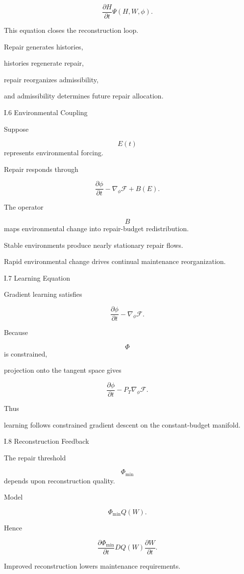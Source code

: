 \documentclass[12pt,oneside]{article}
\theoremstyle{plain}
\theoremstyle{definition}
\theoremstyle{remark}
\begin{document}
\[
\frac{\partial H}{\partial t}
\Psi(H,W,\phi).
\]

This equation closes the reconstruction loop.

Repair generates histories,

histories regenerate repair,

repair reorganizes admissibility,

and admissibility determines future repair allocation.


I.6 Environmental Coupling

Suppose

\[
E(t)
\]
represents environmental forcing.

Repair responds through

\[
\frac{\partial\phi}{\partial t}
- 

\nabla_\phi
\mathcal F
+
B(E).
\]

The operator

\[
B
\]
maps environmental change into repair-budget redistribution.

Stable environments produce nearly stationary repair flows.

Rapid environmental change drives continual maintenance reorganization.


I.7 Learning Equation

Gradient learning satisfies

\[
\frac{\partial\phi}{\partial t}
- 

\nabla_\phi
\mathcal F.
\]

Because

\[
\Phi
\]
is constrained,

projection onto the tangent space gives

\[
\frac{\partial\phi}{\partial t}
- 

P_T
\nabla_\phi
\mathcal F.
\]

Thus

learning follows constrained gradient descent on the constant-budget manifold.


I.8 Reconstruction Feedback

The repair threshold

\[
\Phi_{\min}
\]
depends upon reconstruction quality.

Model

\[
\Phi_{\min}
Q(W).
\]

Hence

\[
\frac{\partial\Phi_{\min}}{\partial t}
DQ(W)
\frac{\partial W}{\partial t}.
\]

Improved reconstruction lowers maintenance requirements.
\end{document}
